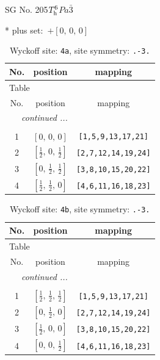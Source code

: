 \documentclass[fleqn,8pt]{jsarticle}
\begin{document}
\setcounter{MaxMatrixCols}{32}

\renewcommand{\tablename}{Table~}
\renewcommand{\figurename}{Figure~}
\begin{center}
\LARGE
SG No. 205\quad$T_{\rm h}^{6}$\quad$Pa\bar{3}$\quad[ cubic ]
\end{center}
* plus set:\,\,\,$+\left[ 0,\, 0,\, 0 \right]$
\renewcommand{\arraystretch}{1.2}
\begin{longtable}{ccc}
\caption{Wyckoff site: {\tt 4a}, site symmetry: {\tt .-3.}}
 \\
 \hline \hline
No. & position & mapping \\ \hline \endfirsthead

\multicolumn{2}{l}{\tablename\ \thetable{}} \\
 \hline \hline
No. & position & mapping \\ \hline \endhead

 \hline \hline
\multicolumn{2}{r}{\footnotesize\it continued ...} \\ \endfoot

 \hline \hline
\multicolumn{2}{r}{} \\ \endlastfoot

1 & $\left[ 0,\, 0,\, 0 \right]$ & {\tt [1,5,9,13,17,21]} \\ \hline
2 & $\left[ \frac{1}{2},\, 0,\, \frac{1}{2} \right]$ & {\tt [2,7,12,14,19,24]} \\ \hline
3 & $\left[ 0,\, \frac{1}{2},\, \frac{1}{2} \right]$ & {\tt [3,8,10,15,20,22]} \\ \hline
4 & $\left[ \frac{1}{2},\, \frac{1}{2},\, 0 \right]$ & {\tt [4,6,11,16,18,23]} \\
\end{longtable}
\renewcommand{\arraystretch}{1.2}
\begin{longtable}{ccc}
\caption{Wyckoff site: {\tt 4b}, site symmetry: {\tt .-3.}}
 \\
 \hline \hline
No. & position & mapping \\ \hline \endfirsthead

\multicolumn{2}{l}{\tablename\ \thetable{}} \\
 \hline \hline
No. & position & mapping \\ \hline \endhead

 \hline \hline
\multicolumn{2}{r}{\footnotesize\it continued ...} \\ \endfoot

 \hline \hline
\multicolumn{2}{r}{} \\ \endlastfoot

1 & $\left[ \frac{1}{2},\, \frac{1}{2},\, \frac{1}{2} \right]$ & {\tt [1,5,9,13,17,21]} \\ \hline
2 & $\left[ 0,\, \frac{1}{2},\, 0 \right]$ & {\tt [2,7,12,14,19,24]} \\ \hline
3 & $\left[ \frac{1}{2},\, 0,\, 0 \right]$ & {\tt [3,8,10,15,20,22]} \\ \hline
4 & $\left[ 0,\, 0,\, \frac{1}{2} \right]$ & {\tt [4,6,11,16,18,23]} \\
\end{longtable}
\end{document}
